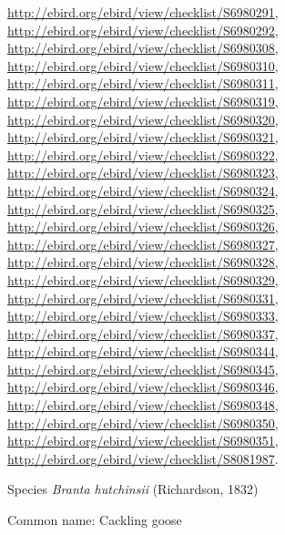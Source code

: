 \documentclass[9pt, article]{memoir}
\begin{document}
\begin{multicols}{2}
\url{http://ebird.org/ebird/view/checklist/S6980291}, 
\url{http://ebird.org/ebird/view/checklist/S6980292}, 
\url{http://ebird.org/ebird/view/checklist/S6980308}, 
\url{http://ebird.org/ebird/view/checklist/S6980310}, 
\url{http://ebird.org/ebird/view/checklist/S6980311}, 
\url{http://ebird.org/ebird/view/checklist/S6980319}, 
\url{http://ebird.org/ebird/view/checklist/S6980320}, 
\url{http://ebird.org/ebird/view/checklist/S6980321}, 
\url{http://ebird.org/ebird/view/checklist/S6980322}, 
\url{http://ebird.org/ebird/view/checklist/S6980323}, 
\url{http://ebird.org/ebird/view/checklist/S6980324}, 
\url{http://ebird.org/ebird/view/checklist/S6980325}, 
\url{http://ebird.org/ebird/view/checklist/S6980326}, 
\url{http://ebird.org/ebird/view/checklist/S6980327}, 
\url{http://ebird.org/ebird/view/checklist/S6980328}, 
\url{http://ebird.org/ebird/view/checklist/S6980329}, 
\url{http://ebird.org/ebird/view/checklist/S6980331}, 
\url{http://ebird.org/ebird/view/checklist/S6980333}, 
\url{http://ebird.org/ebird/view/checklist/S6980337}, 
\url{http://ebird.org/ebird/view/checklist/S6980344}, 
\url{http://ebird.org/ebird/view/checklist/S6980345}, 
\url{http://ebird.org/ebird/view/checklist/S6980346}, 
\url{http://ebird.org/ebird/view/checklist/S6980348}, 
\url{http://ebird.org/ebird/view/checklist/S6980350}, 
\url{http://ebird.org/ebird/view/checklist/S6980351}, 
\url{http://ebird.org/ebird/view/checklist/S8081987}.

\vspace{6pt}\noindent\hspace{36pt}Species \textit{Branta hutchinsii} (Richardson, 1832)


Common name: Cackling goose


\end{multicols}
\end{document}
